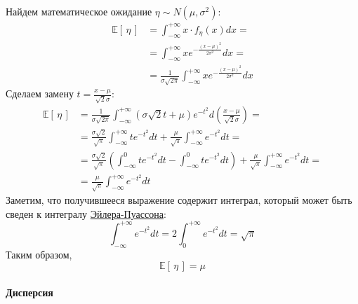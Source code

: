 \documentclass[
  russian,
  a4paper,
]{article}
\let\oldparagraph\paragraph
\renewcommand{\paragraph}[1]{\oldparagraph{#1}\mbox{}}
\begin{document}
Найдем математическое ожидание \(\eta \sim N(\mu, \sigma^2)\):
\[\begin{aligned}
    \mathbb{E}\left[\, \eta \,\right] &= \int_{-\infty}^{+\infty} x \cdot f_\eta(x)dx =\\
                  &= \int_{-\infty}^{+\infty} xe^{-\frac{(x-\mu)^2}{2\sigma^2}}dx =\\
                  &= \frac{1}{\sigma\sqrt{2\pi}} \int_{-\infty}^{+\infty} xe^{-\frac{(x-\mu)^2}{2\sigma^2}}dx
\end{aligned}\] Сделаем замену \(t = \frac{x-\mu}{\sqrt{2}\sigma}\):
\[\begin{aligned}
    \mathbb{E}\left[\, \eta \,\right] &= \frac{1}{\sigma\sqrt{2\pi}} \int_{-\infty}^{+\infty}(\sigma\sqrt{2}t + \mu)
                    e^{-t^2} d\left(\frac{x-\mu}{\sqrt{2}\sigma}\right) =\\
                  &= \frac{\sigma\sqrt{2}}{\sqrt{\pi}}\int_{-\infty}^{+\infty}te^{-t^2}dt
                    + \frac{\mu}{\sqrt{\pi}}\int_{-\infty}^{+\infty}e^{-t^2}dt =\\
                  &= \frac{\sigma\sqrt{2}}{\sqrt{\pi}}\left(\int_{-\infty}^{0}te^{-t^2}dt
                    - \int_{-\infty}^{0}te^{-t^2}dt\right) + \frac{\mu}{\sqrt{\pi}}\int_{-\infty}^{+\infty}e^{-t^2}dt =\\
                  &= \frac{\mu}{\sqrt{\pi}}\int_{-\infty}^{+\infty}e^{-t^2}dt
\end{aligned}\] Заметим, что получившееся выражение содержит интеграл,
который может быть сведен к интегралу
\href{https://ru.wikipedia.org/wiki/Гауссов_интеграл}{Эйлера-Пуассона}:
\[\int_{-\infty}^{+\infty}e^{-t^2}dt = 2\int_{0}^{+\infty}e^{-t^2}dt = \sqrt{\pi}\]
Таким образом, \begin{equation}\boxed{
    \mathbb{E}\left[\, \eta \,\right] = \mu
}\label{eq:n_expected}\end{equation}

\hypertarget{ux434ux438ux441ux43fux435ux440ux441ux438ux44f-1}{%
\paragraph{Дисперсия}\label{ux434ux438ux441ux43fux435ux440ux441ux438ux44f-1}}
\end{document}
